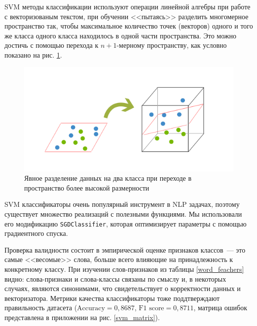 \documentclass[a4paper, 14pt]{extarticle}
\begin{document}
SVM методы классификации используют операции линейной алгебры при работе с векторизованым текстом, при обучении <<пытаясь>> разделить многомерное пространство так, чтобы максимальное количество точек  (векторов) одного и того же класса одного класса находилось в одной части пространства. Это можно достичь с помощью перехода к $n+1$-мерному пространству, как условно показано на рис. \ref{svm_cond}.

\begin{figure}[h!]
	\centering
	\includegraphics[scale=0.6]{svm_cond}
	\caption{Явное разделение данных на два класса при переходе в пространство более высокой размерности}
	\label{svm_cond}
\end{figure}

SVM классификаторы очень популярный инструмент в NLP задачах, поэтому существует множество реализаций с полезными функциями. Мы использовали его модификацию \verb+SGDClassifier+, которая оптимизирует параметры с помощью градиентного спуска.

Проверка валидности состоит в эмпирической оценке признаков классов~--- это самые <<весомые>> слова, больше всего влияющие на принадлежность к конкретному классу. При изучении слов-признаков из таблицы \ref{word_feachers} видно: слова-признаки и слова-классы связаны по смыслу и, в некоторых случаях, являются синонимами, что свидетельствует о корректности данных и векторизатора. Метрики качества классификаторы тоже поддтверждают правильность датасета ($\text{Accuracy} = 0,8687$, $\text{F1 score} = 0,8711$, матрица ошибок представлена в приложении на рис. \ref{svm_matrix}).
\end{document}
